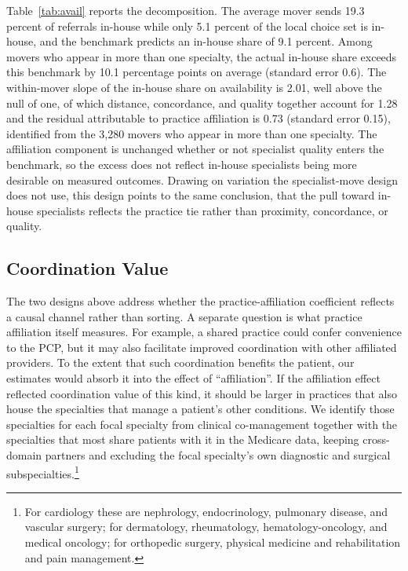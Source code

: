 \documentclass[12pt]{article}
\begin{document}
Table~\ref{tab:avail} reports the decomposition. The average mover sends 19.3 percent of referrals in-house while only 5.1 percent of the local choice set is in-house, and the benchmark predicts an in-house share of 9.1 percent. Among movers who appear in more than one specialty, the actual in-house share exceeds this benchmark by 10.1 percentage points on average (standard error 0.6). The within-mover slope of the in-house share on availability is 2.01, well above the null of one, of which distance, concordance, and quality together account for 1.28 and the residual attributable to practice affiliation is 0.73 (standard error 0.15), identified from the 3,280 movers who appear in more than one specialty. The affiliation component is unchanged whether or not specialist quality enters the benchmark, so the excess does not reflect in-house specialists being more desirable on measured outcomes. Drawing on variation the specialist-move design does not use, this design points to the same conclusion, that the pull toward in-house specialists reflects the practice tie rather than proximity, concordance, or quality.


\subsection{Coordination Value}
\label{sec:coordination}

The two designs above address whether the practice-affiliation coefficient reflects a causal channel rather than sorting. A separate question is what practice affiliation itself measures. For example, a shared practice could confer convenience to the PCP, but it may also facilitate improved coordination with other affiliated providers. To the extent that such coordination benefits the patient, our estimates would absorb it into the effect of ``affiliation''. If the affiliation effect reflected coordination value of this kind, it should be larger in practices that also house the specialties that manage a patient's other conditions. We identify those specialties for each focal specialty from clinical co-management together with the specialties that most share patients with it in the Medicare data, keeping cross-domain partners and excluding the focal specialty's own diagnostic and surgical subspecialties.\footnote{For cardiology these are nephrology, endocrinology, pulmonary disease, and vascular surgery; for dermatology, rheumatology, hematology-oncology, and medical oncology; for orthopedic surgery, physical medicine and rehabilitation and pain management.}
\end{document}
